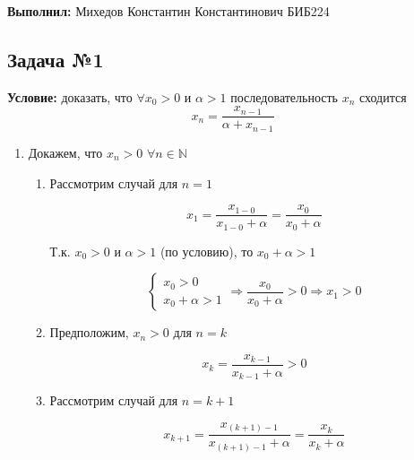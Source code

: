 \documentclass[class=article,a4paper,12pt,crop=false]{standalone}
\begin{document}
  \textbf{Выполнил:} Михедов Константин Константинович БИБ224

  \subsection{Задача №1}

  \textbf{Условие:} доказать, что $\forall x_0 > 0$ и $\alpha > 1$ последовательность $x_n$ сходится
  \[x_{n} = \frac{x_{n - 1}}{\alpha + x_{n - 1}}\] 

  \begin{enumerate}
    \item {
        Докажем, что $x_n > 0$ $\forall n \in \mathbb{N}$

        \begin{enumerate}
            \item {
                Рассмотрим случай для $n = 1$

                \begin{equation}
                    x_1 = \frac{x_{1 - 0}}{x_{1 - 0} + \alpha} =
                    \frac{x_0}{x_0 + \alpha}
                \end{equation}

                Т.к. $x_0 > 0$ и $\alpha > 1$ (по условию),
                то $x_0 + \alpha > 1 $

                \begin{equation}
                    \begin{cases}
                        x_0 > 0 \\
                        x_0 + \alpha > 1
                    \end{cases}
                    \Rightarrow \frac{x_0}{x_0 + \alpha} > 0
                    \Rightarrow x_1 > 0
                \end{equation}
            }
            \item {
                Предположим, $x_n > 0$ для $n = k$
                
                \begin{equation}
                    x_k = \frac{x_{k - 1}}{x_{k - 1} + \alpha} > 0
                \end{equation}
            }
            \item {
                Рассмотрим случай для $n = k + 1$

                \begin{equation}
                    x_{k + 1} = \frac{x_{(k + 1) - 1}}{x_{(k + 1) - 1} + \alpha}
                    = \frac{x_k}{x_k + \alpha}
                \end{equation}

}
\end{enumerate}}
\end{enumerate}
\end{document}
